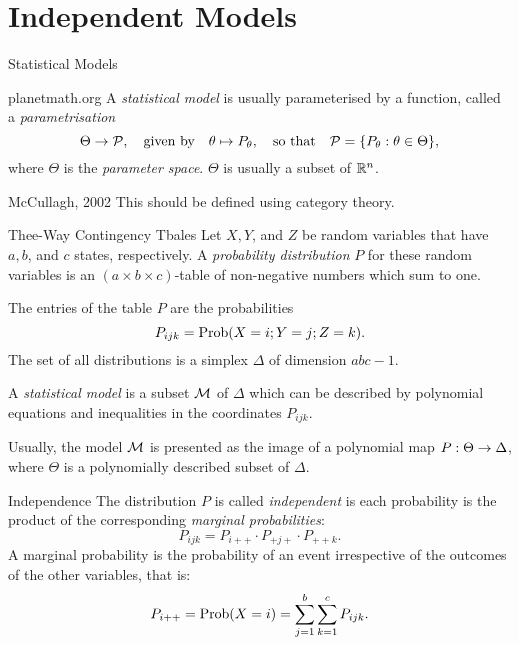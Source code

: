 \section{Independent Models}

\begin{frame}{Statistical Models}
    \begin{block}{planetmath.org}
    A \emph{statistical model} is usually parameterised by a function, called a \emph{parametrisation}
    $$ \Theta \rightarrow \mathcal{P}, \quad \text{given by} \quad \theta \mapsto P_{\theta},\quad \text{so that}\quad \mathcal{P} = \{ P_{\theta} : \theta \in \Theta \}, $$
    where $\Theta$ is the \emph{parameter space}. $\Theta$ is usually a subset of $\mathbb{R}^{n}$.
    \end{block}

    \begin{block}{McCullagh, 2002}
    This should be defined using category theory.
    \end{block}
\end{frame}

\begin{frame}{Thee-Way Contingency Tbales}
    Let $X, Y$, and $Z$ be random variables that have $a, b$, and $c$ states, respectively. A \emph{probability distribution} $P$ for these random variables is an $(a \times b \times c)$-table of non-negative numbers which sum to one.

    The entries of the table $P$ are the probabilities
    $$ P_{ijk} = \operatorname{Prob}(X = i; Y = j; Z = k). $$
    The set of all distributions is a simplex $\Delta$ of dimension $abc - 1$.

    A \emph{statistical model} is a subset $\mathcal{M}$ of $\Delta$ which can be described by polynomial equations and inequalities in the coordinates $P_{ijk}$.

    Usually, the model $\mathcal{M}$ is presented as the image of a polynomial map $P: \Theta \rightarrow \Delta$, where $\Theta$ is a polynomially described subset of $\Delta$.
\end{frame}

\begin{frame}{Independence}
    The distribution $P$ is called \emph{independent} is each probability is the product of the corresponding \emph{marginal probabilities}:
    $$ P_{ijk} = P_{i++} \cdot P_{+j+} \cdot P_{++k}. $$
    A marginal probability is the probability of an event irrespective of the outcomes of the other variables, that is:
    $$ P_{i++} = \operatorname{Prob}(X = i) = \sum_{j=1}^{b} \sum_{k=1}^{c} P_{ijk}. $$
\end{frame}

